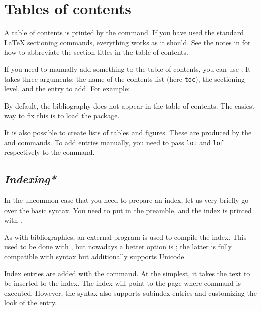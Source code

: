 %
%
%
\section{Tables of contents}

A table of contents is printed by the  command.
If you have used the standard \LaTeX{} sectioning commands,
everything works as it should.
See the notes in 
for how to abbreviate the section titles in the table of contents.


If you need to manually add something to the table of contents,
you can use .
It takes three arguments:
the name of the contents list (here \verb|toc|), the sectioning level, and the entry to add.
For example:
\begin{ExampleCode}
\end{ExampleCode}

By default, the bibliography does not appear in the table of contents.
The easiest way to fix this is to load the  package.

It is also possible to create lists of tables and figures.
These are produced by the  and  commands.
To add entries manually, you need to pass \verb|lot| and \verb|lof|
respectively to the  command.


%
\subsection{\emph{Indexing*}}

In the uncommon case that you need to prepare an index,
let us very briefly go over the basic syntax.
You need to put  in the preamble,
and the index is printed with .

As with bibliographies, an external program is used to compile the index.
This used to be done with ,
but nowadays a better option is ;
the latter is fully compatible with  syntax
but additionally supports Unicode.

Index entries are added with the  command.
At the simplest, it takes the text to be inserted to the index.
The index will point to the page where command is executed.
However, the syntax also supports subindex entries
and customizing the look of the entry.

